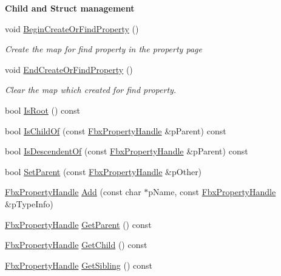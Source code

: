 \begin{Indent}\textbf{ Child and Struct management}\par
\begin{DoxyCompactItemize}
\item 
void \hyperlink{class_fbx_property_handle_a1845e4c188e4557e44a1052c5d03d08f}{Begin\+Create\+Or\+Find\+Property} ()
\begin{DoxyCompactList}\small\item\em Create the map for find property in the property page \end{DoxyCompactList}\item 
void \hyperlink{class_fbx_property_handle_a05f9bc5dcbb93bbde02ffc6c7b640632}{End\+Create\+Or\+Find\+Property} ()
\begin{DoxyCompactList}\small\item\em Clear the map which created for find property. \end{DoxyCompactList}\item 
bool \hyperlink{class_fbx_property_handle_ab1da9089aefb10740cdb3aad0754d200}{Is\+Root} () const
\item 
bool \hyperlink{class_fbx_property_handle_a8181cf2b414e45cb3fd0cdef8d60fb33}{Is\+Child\+Of} (const \hyperlink{class_fbx_property_handle}{Fbx\+Property\+Handle} \&p\+Parent) const
\item 
bool \hyperlink{class_fbx_property_handle_af6d512f55181fbaf2f973aa33ebd1a34}{Is\+Descendent\+Of} (const \hyperlink{class_fbx_property_handle}{Fbx\+Property\+Handle} \&p\+Parent) const
\item 
bool \hyperlink{class_fbx_property_handle_a4ce451166cd44ea838b4e4f1b5a8e8ad}{Set\+Parent} (const \hyperlink{class_fbx_property_handle}{Fbx\+Property\+Handle} \&p\+Other)
\item 
\hyperlink{class_fbx_property_handle}{Fbx\+Property\+Handle} \hyperlink{class_fbx_property_handle_afcbe2140bff2342bc216f392d6132bb6}{Add} (const char $\ast$p\+Name, const \hyperlink{class_fbx_property_handle}{Fbx\+Property\+Handle} \&p\+Type\+Info)
\item 
\hyperlink{class_fbx_property_handle}{Fbx\+Property\+Handle} \hyperlink{class_fbx_property_handle_a10599909c3fc0a5bdfba5b7dc05f8ec6}{Get\+Parent} () const
\item 
\hyperlink{class_fbx_property_handle}{Fbx\+Property\+Handle} \hyperlink{class_fbx_property_handle_a6160671cde8bff49fe5552ea9bdde1cd}{Get\+Child} () const
\item 
\hyperlink{class_fbx_property_handle}{Fbx\+Property\+Handle} \hyperlink{class_fbx_property_handle_a216afaae427671182799347b99a1eb12}{Get\+Sibling} () const

\end{DoxyCompactItemize}
\end{Indent}
